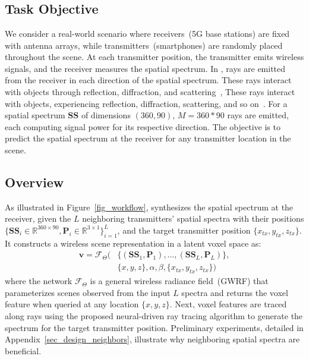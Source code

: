 
\section{\ourSystem}
\label{sec_design}



\subsection{Task Objective}  
We consider a real-world scenario where receivers~(\eg 5G base stations) are fixed with antenna arrays, while transmitters~(\eg smartphones) are randomly placed throughout the scene. 
At each transmitter position, the transmitter emits wireless signals, and the receiver measures the spatial spectrum.
In \ourSystem, rays are emitted from the receiver in each direction of the spatial spectrum.
These rays interact with objects through reflection, diffraction, and scattering~\cite{bondeson2012computational},
These rays interact with objects, experiencing reflection, diffraction, scattering, and so on~\cite{bondeson2012computational}.
For a spatial spectrum $\mathbf{SS}$ of dimensions $(360, 90)$, \(M = 360 * 90\) rays are emitted, each computing signal power for its respective direction. 
The objective is to predict the spatial spectrum at the receiver for any transmitter location in the scene.



\subsection{Overview}

As illustrated in Figure~\ref{fig_workflow}, \ourSystem synthesizes the spatial spectrum at the receiver, given the $L$ neighboring transmitters' spatial spectra with their positions 
$\{\mathbf{SS}_i \in \mathbb{R}^{360 \times 90}, \mathbf{P}_i \in \mathbb{R}^{3 \times 1}\}_{i=1}^L$, and the target transmitter position $\{x_{tx}, y_{tx}, z_{tx}\}$. 
It constructs a wireless scene representation in a latent voxel space as:
\begin{equation}
\begin{split}
\mathbf{v} = \mathcal{F}_{\Theta} \big( 
    & \{\left( \mathbf{SS}_1, \mathbf{P}_1\right), \dots, \left(\mathbf{SS}_L, \mathbf{P}_L\right)\}, \\
    & \{x, y, z\}, \alpha, \beta, \{x_{tx}, y_{tx}, z_{tx}\} 
\big)
\end{split}
\end{equation}
where the network $\mathcal{F}_{\Theta}$ is a general wireless radiance field~(GWRF) that parameterizes scenes observed from the input $L$ spectra and returns the voxel feature when queried at any location $\{x, y, z\}$.
Next, voxel features are traced along rays using the proposed neural-driven ray tracing algorithm to generate the spectrum for the target transmitter position.
Preliminary experiments, detailed in Appendix~\ref{sec_design_neighbors}, illustrate why neighboring spatial spectra are beneficial.

